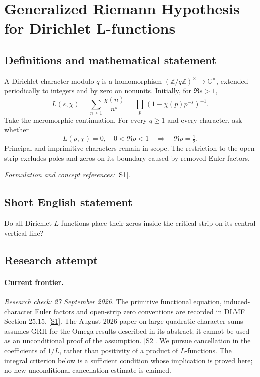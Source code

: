 \documentclass[11pt,a4paper]{article}
\newcommand{\Z}{\mathbb{Z}}
\newcommand{\C}{\mathbb{C}}
\newcommand{\sref}[2]{\hyperlink{source:#1:#2}{[S#2]}}
\newif\ifshowcatalogue
\newcommand{\cataloguescope}[1]{\ifshowcatalogue
 \paragraph{Exact scope in the supplied catalogue.}
 \begin{quote}\small #1\end{quote}\fi}
\begin{document}
\setcounter{section}{0}
\clearpage
\section*{\texorpdfstring{Generalized Riemann Hypothesis for Dirichlet L-functions}{Generalized Riemann Hypothesis for Dirichlet L-functions}}\label{statement}
\subsection{Definitions and mathematical statement}
A Dirichlet character modulo $q$ is a homomorphism $(\Z/q\Z)^\times\to\C^\times$, extended periodically to integers and by zero on nonunits. Initially, for $\Re s>1$,
\[
 L(s,\chi)=\sum_{n\ge1}\frac{\chi(n)}{n^s}=\prod_p(1-\chi(p)p^{-s})^{-1}.
\]
Take the meromorphic continuation. For every $q\ge1$ and every character, ask whether
\[
 L(\rho,\chi)=0,\quad0<\Re\rho<1\quad\Longrightarrow\quad\Re\rho=\tfrac12.
\]
Principal and imprimitive characters remain in scope. The restriction to the open strip excludes poles and zeros on its boundary caused by removed Euler factors.
\par\smallskip\textit{Formulation and concept references:} \sref{statement}{1}.
\cataloguescope{For every integer q>=1 and every Dirichlet character chi modulo q, including principal and imprimitive characters, every zero s of the meromorphic continuation of L(s,chi)=sum\_\{n>=1\}chi(n)n\textasciicircum{}(-s) in 0<Re(s)<1 satisfies Re(s)=1/2. The continuation is from Re(s)>1. Only open-strip zeros are quantified: principal-character poles and boundary zeros of imprimitive Euler factors are not counterexamples. No simplicity or central nonvanishing requirement is added.}
\subsection{Short English statement}
Do all Dirichlet $L$-functions place their zeros inside the critical strip on its central vertical line?
\subsection{Research attempt}
\paragraph{Current frontier.}
\textit{Research check: 27 September 2026.}
The primitive functional equation, induced-character Euler factors and
open-strip zero conventions are recorded in DLMF Section 25.15.
\sref{statement}{1}. The August 2026 paper on large quadratic character sums
assumes GRH for the Omega results described in its abstract; it cannot
be used as an unconditional proof of the assumption. \sref{statement}{2}.
We pursue cancellation in the coefficients of $1/L$, rather than
positivity of a product of $L$-functions. The integral criterion below
is a sufficient condition whose implication is proved here; no new
unconditional cancellation estimate is claimed.
\end{document}
